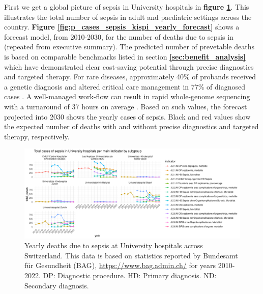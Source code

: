 First we get a global picture of sepsis in University hospitals in 
\textbf{figure
\ref{fig:p_cases_sepsis_uni_yearly}}. 
This illustrates the total number of sepsis in adult and paediatric settings across the country.
\textbf{Figure \ref{fig:p_cases_sepsis_kispi_yearly_forecast}} 
shows a forecast model, from 2010-2030, for the number of deaths due to sepsis in \kispi
(repeated from executive summary).
The predicted number of prevetable deaths is based on comparable benchmarks listed in section 
\textbf{\ref{sec:benefit_analysis}} 
which have demonstrated clear cost-saving potential through precise diagnostics and targeted therapy.
For rare diseases, approximately 40\% of probands received a genetic diagnosis 
\citep{wright2023genomic, wojcik2024genome}
and altered critical care management in 77\% of diagnosed cases \citep{lunke2023integrated}.
A well-managed work-flow can result in rapid whole-genome sequencing with a turnaround of 37 hours on average
 \citep{abou2023rapid}.
Based on such values, the forecast  projected into 2030 shows the yearly cases of sepsis.
Black and red values show the expected number of deaths with and without  precise diagnostics and targeted therapy, respectively. 

\begin{figure}[h] \hspace*{0cm} 
\begin{center}
	\includegraphics[width=1\textwidth]{../stats/foph_key_stats/output/p_cases_sepsis_uni_yearly}
	\caption{Yearly deaths due to sepsis at University hospitals across Switzerland.
	This data is based on statistics reported by Bundesamt für Gesundheit (BAG), 
	\url{https://www.bag.admin.ch/} for years 2010-2022. 
		DP: Diagnostic procedure.
HD: Primary diagnosis.
ND: Secondary diagnosis.}
	\label{fig:p_cases_sepsis_uni_yearly}
\end{center}
\end{figure}

